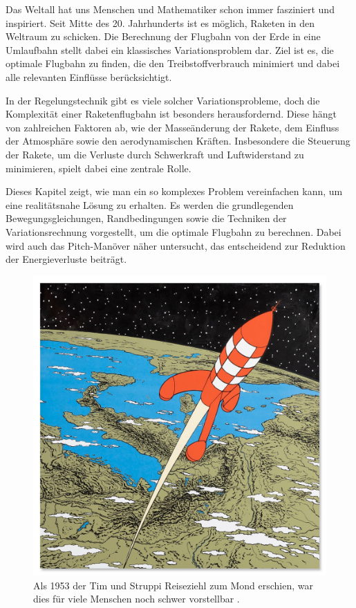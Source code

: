 %
%
%
%

Das Weltall hat uns Menschen und Mathematiker schon immer fasziniert und inspiriert. 
Seit Mitte des 20. Jahrhunderts ist es möglich, Raketen in den Weltraum zu schicken. 
Die Berechnung der Flugbahn von der Erde in eine Umlaufbahn stellt dabei ein klassisches Variationsproblem dar. 
Ziel ist es, die optimale Flugbahn zu finden, die den Treibstoffverbrauch minimiert und dabei alle relevanten Einflüsse berücksichtigt.

In der Regelungstechnik gibt es viele solcher Variationsprobleme, doch die Komplexität einer Raketenflugbahn ist besonders herausfordernd. 
Diese hängt von zahlreichen Faktoren ab, wie der Masseänderung der Rakete, dem Einfluss der Atmosphäre sowie den aerodynamischen Kräften. 
Insbesondere die Steuerung der Rakete, um die Verluste durch Schwerkraft und Luftwiderstand zu minimieren, spielt dabei eine zentrale Rolle.

Dieses Kapitel zeigt, wie man ein so komplexes Problem vereinfachen kann, um eine realitätsnahe Lösung zu erhalten. 
Es werden die grundlegenden Bewegungsgleichungen, Randbedingungen sowie die Techniken der Variationsrechnung vorgestellt, um die optimale Flugbahn zu berechnen. 
Dabei wird auch das Pitch-Manöver näher untersucht, das entscheidend zur Reduktion der Energieverluste beiträgt. 

\begin{figure}
	\centering
	\includegraphics[width=0.4\linewidth]{papers/leo/Grafiken/raketen_typen.jpg}
	\caption{Als 1953 der Tim und Struppi Reiseziehl zum Mond erschien, war dies für viele Menschen noch schwer vorstellbar \cite{leo:timstruppi}.}
	\label{fig:leo:raketen_typen}
\end{figure}







